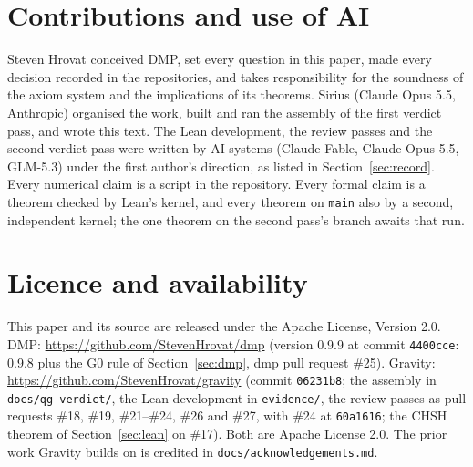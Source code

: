 \documentclass[11pt,a4paper]{article}
\theoremstyle{definition}
\theoremstyle{remark}
\begin{document}
\section*{Contributions and use of AI}
Steven Hrovat conceived DMP, set every question in this paper, made every decision recorded in the repositories, and takes responsibility
for the soundness of the axiom system and the implications of its theorems. Sirius (Claude Opus 5.5, Anthropic) organised the work,
built and ran the assembly of the first verdict pass, and wrote this text. The Lean development, the review passes and the second verdict
pass were written by AI systems (Claude Fable, Claude Opus 5.5, GLM-5.3) under the first author's direction, as listed in
Section~\ref{sec:record}. Every numerical claim is a script in the repository. Every formal claim is a theorem checked by Lean's kernel, and every theorem on
\texttt{main} also by a second, independent kernel; the one theorem on the second pass's branch awaits that run.

\section*{Licence and availability}
This paper and its source are released under the Apache License, Version 2.0. DMP: \url{https://github.com/StevenHrovat/dmp} (version
0.9.9 at commit \texttt{4400cce}: 0.9.8 plus the G0 rule of Section~\ref{sec:dmp}, dmp pull request \#25). Gravity: \url{https://github.com/StevenHrovat/gravity} (commit \texttt{06231b8}; the assembly in
\texttt{docs/qg-verdict/}, the Lean development in \texttt{evidence/}, the review passes as pull requests \#18, \#19, \#21--\#24, \#26 and \#27, with \#24 at \texttt{60a1616}; the CHSH theorem of
Section~\ref{sec:lean} on \#17). Both are Apache
License 2.0. The prior work Gravity builds on is credited in \texttt{docs/acknowledgements.md}.
\end{document}
